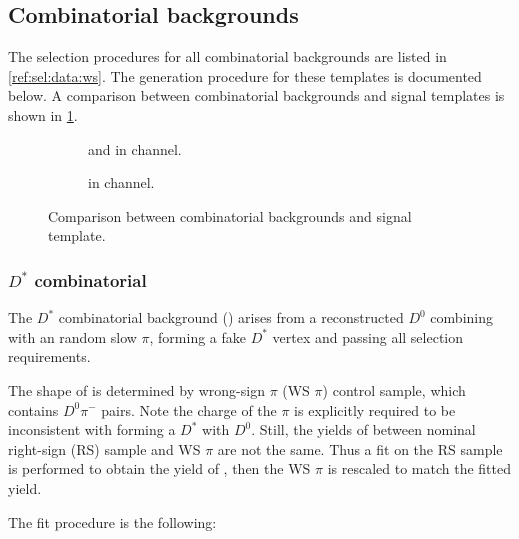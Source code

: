 \subsection{Combinatorial backgrounds}
\label{ref:fit:tmpl:comb}

The selection procedures for all combinatorial backgrounds are listed
in \cref{ref:sel:data:ws}.
The generation procedure for these templates is documented below.
A comparison between combinatorial backgrounds and signal templates is
shown in \cref{fig:comb-vs-sig}.

\begin{figure}[htb]
    \centering
    \begin{subfigure}[t]{0.45\textwidth}
        \centering
        \caption{
            \BComb and \DstComb in \Dstar channel.
        }
    \end{subfigure}
    \begin{subfigure}[t]{0.45\textwidth}
        \centering
        \caption{
            \BComb in \Dz channel.
        }
    \end{subfigure}

    \caption{
        Comparison between combinatorial backgrounds and signal template.
    }
    \label{fig:comb-vs-sig}
\end{figure}

\subsubsection{$D^*$ combinatorial}

The $D^*$ combinatorial background (\DstComb) arises from a reconstructed $D^0$
combining with an random slow $\pi$, forming a fake $D^*$ vertex and
passing all selection requirements.

The shape of \DstComb is determined by wrong-sign $\pi$ (WS $\pi$) control
sample, which contains $D^0 \pi^-$ pairs.
Note the charge of the $\pi$ is explicitly required to be inconsistent with
forming a $D^*$ with $D^0$.
Still, the yields of \DstComb between nominal right-sign (RS) sample and
WS $\pi$ are not the same. Thus a fit on the RS sample is performed to obtain
the yield of \DstComb, then the WS $\pi$ is rescaled to match the fitted yield.

The fit procedure is the following:

